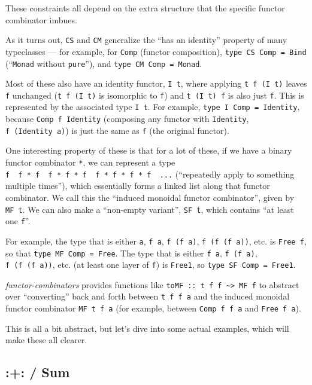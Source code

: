 \documentclass[]{article}
\begin{document}
These constraints all depend on the extra structure that the specific functor
combinator imbues.

As it turns out, \texttt{CS} and \texttt{CM} generalize the ``has an identity''
property of many typeclasses --- for example, for \texttt{Comp} (functor
composition), \texttt{type\ CS\ Comp\ =\ Bind} (``\texttt{Monad} without
\texttt{pure}''), and \texttt{type\ CM\ Comp\ =\ Monad}.

Most of these also have an identity functor, \texttt{I\ t}, where applying
\texttt{t\ f\ (I\ t)} leaves \texttt{f} unchanged (\texttt{t\ f\ (I\ t)} is
isomorphic to \texttt{f}) and \texttt{t\ (I\ t)\ f} is also just \texttt{f}.
This is represented by the associated type \texttt{I\ t}. For example,
\texttt{type\ I\ Comp\ =\ Identity}, because \texttt{Comp\ f\ Identity}
(composing any functor with \texttt{Identity}, \texttt{f\ (Identity\ a)}) is
just the same as \texttt{f} (the original functor).

One interesting property of these is that for a lot of these, if we have a
binary functor combinator \texttt{*}, we can represent a type
\texttt{f\ \textbar{}\ f\ *\ f\ \textbar{}\ f\ *\ f\ *\ f\ \textbar{}\ f\ *\ f\ *\ f\ *\ f\ \textbar{}\ ...}
(``repeatedly apply to something multiple times''), which essentially forms a
linked list along that functor combinator. We call this the ``induced monoidal
functor combinator'', given by \texttt{MF\ t}. We can also make a ``non-empty
variant'', \texttt{SF\ t}, which contains ``at least one \texttt{f}''.

For example, the type that is either \texttt{a}, \texttt{f\ a},
\texttt{f\ (f\ a)}, \texttt{f\ (f\ (f\ a))}, etc. is \texttt{Free\ f}, so that
\texttt{type\ MF\ Comp\ =\ Free}. The type that is either \texttt{f\ a},
\texttt{f\ (f\ a)}, \texttt{f\ (f\ (f\ a))}, etc. (at least one layer of
\texttt{f}) is \texttt{Free1}, so \texttt{type\ SF\ Comp\ =\ Free1}.

\emph{functor-combinators} provides functions like
\texttt{toMF\ ::\ t\ f\ f\ \textasciitilde{}\textgreater{}\ MF\ f} to abstract
over ``converting'' back and forth between \texttt{t\ f\ f\ a} and the induced
monoidal functor combinator \texttt{MF\ t\ f\ a} (for example, between
\texttt{Comp\ f\ f\ a} and \texttt{Free\ f\ a}).

This is all a bit abstract, but let's dive into some actual examples, which will
make these all clearer.

\hypertarget{sum}{%
\subsection{:+: / Sum}\label{sum}}
\end{document}
